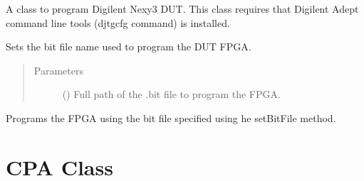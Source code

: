 \documentclass[letterpaper,10pt,english]{sphinxmanual}
\begin{document}
\begin{fulllineitems}
\label{\detokenize{reference_doc:Nexys3DUT}}
A class to program Digilent Nexy3 DUT. This class requires that Digilent Adept command line tools (djtgcfg command) is installed.

\begin{fulllineitems}
\label{\detokenize{reference_doc:Nexys3DUT.setBitFile}}
Sets the bit file name used to program the DUT FPGA.
\begin{quote}\begin{description}
\item[{Parameters}] \leavevmode
{} () \textendash{} Full path of the .bit file to program the FPGA.

\end{description}\end{quote}

\end{fulllineitems}


\begin{fulllineitems}
\label{\detokenize{reference_doc:Nexys3DUT.program}}
Programs the FPGA using the bit file specified using he setBitFile method.

\end{fulllineitems}


\end{fulllineitems}



\section{CPA Class}
\label{\detokenize{reference_doc:cpa-class}}
\end{document}
